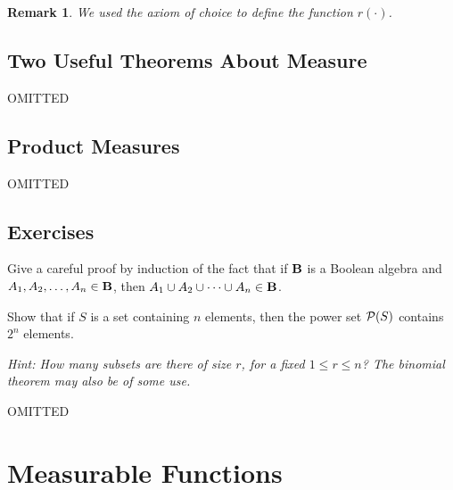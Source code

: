 \documentclass[a4paper]{report}
\newcounter{thm_counter}[chapter]
\newtheorem{remark}[thm_counter]{Remark}
\numberwithin{equation}{chapter}
\numberwithin{thm_counter}{section}
\begin{document}
\begin{remark}
We used the axiom of choice to define the function $r(\cdot)$. 
\end{remark}



\newpage
\section{Two Useful Theorems About Measure}
\label{sec:two_useful_thms}

OMITTED

\newpage
\section{Product Measures}
\label{sec:prod_meas_350}
OMITTED

\newpage
\section[Exercises 1]{Exercises}


\begin{pslist}

\item 
\label{ps:boolean_union}
Give a careful proof by induction of the fact that if ${\bf B}$ is a Boolean algebra and $A_{1}, A_{2}, \ldots, A_{n} \in {\bf B}$, then $A_{1} \cup A_{2} \cup \cdots \cup A_{n} \in {\bf B}$.

\item 
\label{ps:size_Pn}
Show that if $S$ is a set containing $n$ elements, then the power set ${\cal P}(S)$ contains $2^{n}$ elements.

\textit{Hint: How many subsets are there of size $r$, for a fixed $1 \leq r \leq n$? The binomial theorem may also be of some use.}

\item OMITTED

\end{pslist}




\chapter{Measurable Functions}
\label{chap:measurable_funcs}
\end{document}
